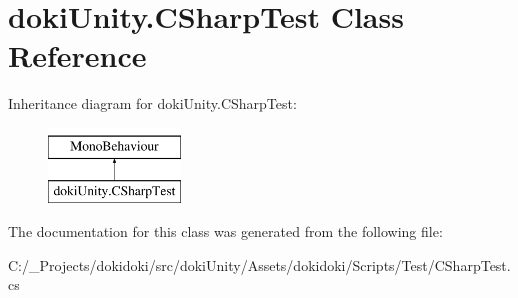 \hypertarget{classdoki_unity_1_1_c_sharp_test}{}\section{doki\+Unity.\+C\+Sharp\+Test Class Reference}
\label{classdoki_unity_1_1_c_sharp_test}
Inheritance diagram for doki\+Unity.\+C\+Sharp\+Test\+:\begin{figure}[H]
\begin{center}
\leavevmode
\includegraphics[height=2.000000cm]{classdoki_unity_1_1_c_sharp_test}
\end{center}
\end{figure}


The documentation for this class was generated from the following file\+:\begin{DoxyCompactItemize}
\item 
C\+:/\+\_\+\+Projects/dokidoki/src/doki\+Unity/\+Assets/dokidoki/\+Scripts/\+Test/C\+Sharp\+Test.\+cs\end{DoxyCompactItemize}
